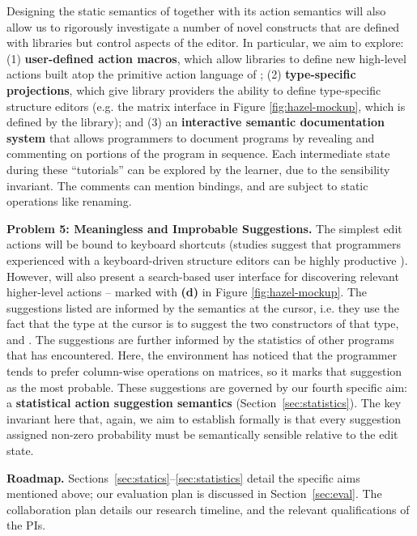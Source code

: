Designing the static semantics of \HazelEnv together with its action semantics 
will also allow us to rigorously investigate a number of novel constructs that 
are defined with libraries but control aspects of the editor. In particular, we aim to explore:
(1) \textbf{user-defined action macros}, which allow libraries to define new high-level
actions built atop the primitive action language of \HazelEnv; (2) \textbf{type-specific
projections}, which give library providers the ability to define type-specific structure editors (e.g. the matrix interface in Figure \ref{fig:hazel-mockup}, which is defined  
by the  library); and (3) an \textbf{interactive semantic documentation system} that
allows programmers to document programs by revealing and commenting on portions of the 
program in sequence. Each intermediate state during these ``tutorials'' can be explored 
by the learner, due to the sensibility invariant. The comments can mention bindings, and are 
subject to static operations like renaming.

\vspace{0.25ex}
\noindent\textbf{Problem 5: Meaningless and Improbable Suggestions.} The simplest 
edit actions will be bound to keyboard shortcuts (studies suggest that programmers experienced with a keyboard-driven structure editors can be highly productive \cite{DBLP:conf/vl/Asenov014}). However, \HazelEnv will 
also present a search-based user
interface for discovering relevant higher-level actions -- marked with \textbf{(d)} in Figure \ref{fig:hazel-mockup}. 
The suggestions 
listed are informed by the semantics at the cursor, i.e. they use the fact that
the type at the cursor is  to suggest the two constructors of that
type,  and . The suggestions are further informed by
the statistics of other programs that \HazelEnv has encountered.  Here, the
environment has noticed that the programmer tends to prefer column-wise operations on 
matrices, so it marks that suggestion as the most probable. These suggestions are governed by
our fourth specific aim: a \textbf{statistical action suggestion semantics} (Section~\ref{sec:statistics}). The key invariant here that, again, we aim to establish 
formally is that every suggestion assigned non-zero probability must be semantically sensible 
relative to the edit state.%

\vspace{0.25ex}
\noindent\textbf{Roadmap.} Sections~\ref{sec:statics}--\ref{sec:statistics} detail the
specific aims mentioned above; our evaluation plan is discussed in Section~\ref{sec:eval}.
The collaboration plan details our 
research timeline, and the relevant qualifications of the PIs.

